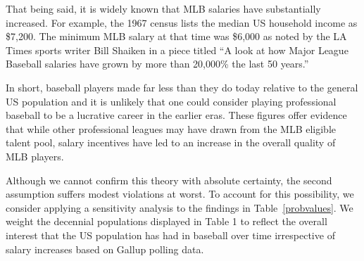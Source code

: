 \documentclass[11pt]{article}\usepackage[]{graphicx}\usepackage[]{color}
\begin{document}
That being said, it is widely known that 
MLB salaries have substantially increased.
For example, the 1967 census lists the median US household income as \$7,200. 
The minimum MLB salary at that time was \$6,000 as noted by the LA Times 
sports writer Bill Shaiken in a piece titled ``A look at how Major League 
Baseball salaries have grown by more than 20,000\% the last 50 years.''

In short,
baseball players made far less than they do today relative to the general US 
population and it is unlikely that one could consider playing professional 
baseball to be a lucrative career in the earlier eras. 
These figures offer evidence that while other 
professional leagues may have drawn from the MLB eligible talent pool, 
salary incentives have led to an increase in the overall quality of MLB 
players.  %








Although we cannot confirm this theory with absolute certainty, the second 
assumption suffers modest violations at worst.  
To account for this possibility, we consider applying a sensitivity analysis to the findings
in Table~\ref{probvalues}.  We weight the 
decennial populations displayed in Table 1 to reflect the overall interest 
that the US population has had in baseball over time irrespective of salary 
increases based on Gallup polling data.  
\end{document}

